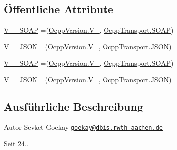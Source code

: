 \subsection*{Öffentliche Attribute}
\begin{DoxyCompactItemize}
\item 
\hyperlink{enumde_1_1rwth_1_1idsg_1_1steve_1_1ocpp_1_1_ocpp_protocol_a8d3c28a7f752ada8544f49a26fd75bf9}{V\-\_\-\_\-\-S\-O\-A\-P} =(\hyperlink{enumde_1_1rwth_1_1idsg_1_1steve_1_1ocpp_1_1_ocpp_version_a02a262b834136db4a30bb9a821c77574}{Ocpp\-Version.\-V\-\_}, \hyperlink{enumde_1_1rwth_1_1idsg_1_1steve_1_1ocpp_1_1_ocpp_transport_ae1fa7bdd519c49e7c5d175538ec2eb47}{Ocpp\-Transport.\-S\-O\-A\-P})
\item 
\hyperlink{enumde_1_1rwth_1_1idsg_1_1steve_1_1ocpp_1_1_ocpp_protocol_a0b890b1200cee602749371f323d0a686}{V\-\_\-\_\-\-J\-S\-O\-N} =(\hyperlink{enumde_1_1rwth_1_1idsg_1_1steve_1_1ocpp_1_1_ocpp_version_a02a262b834136db4a30bb9a821c77574}{Ocpp\-Version.\-V\-\_}, \hyperlink{enumde_1_1rwth_1_1idsg_1_1steve_1_1ocpp_1_1_ocpp_transport_aa9ac4184d327d7868285a13790f45cdc}{Ocpp\-Transport.\-J\-S\-O\-N})
\item 
\hyperlink{enumde_1_1rwth_1_1idsg_1_1steve_1_1ocpp_1_1_ocpp_protocol_a7476dab1a43648c24ed27bb7a6dc4cc1}{V\-\_\-\_\-\-S\-O\-A\-P} =(\hyperlink{enumde_1_1rwth_1_1idsg_1_1steve_1_1ocpp_1_1_ocpp_version_a73e998996dec6fa643fc3241249866d4}{Ocpp\-Version.\-V\-\_}, \hyperlink{enumde_1_1rwth_1_1idsg_1_1steve_1_1ocpp_1_1_ocpp_transport_ae1fa7bdd519c49e7c5d175538ec2eb47}{Ocpp\-Transport.\-S\-O\-A\-P})
\item 
\hyperlink{enumde_1_1rwth_1_1idsg_1_1steve_1_1ocpp_1_1_ocpp_protocol_a80b0fbd3a74af3443ec943f4e32fe7fa}{V\-\_\-\_\-\-J\-S\-O\-N} =(\hyperlink{enumde_1_1rwth_1_1idsg_1_1steve_1_1ocpp_1_1_ocpp_version_a73e998996dec6fa643fc3241249866d4}{Ocpp\-Version.\-V\-\_}, \hyperlink{enumde_1_1rwth_1_1idsg_1_1steve_1_1ocpp_1_1_ocpp_transport_aa9ac4184d327d7868285a13790f45cdc}{Ocpp\-Transport.\-J\-S\-O\-N})
\end{DoxyCompactItemize}


\subsection{Ausführliche Beschreibung}
\begin{DoxyAuthor}{Autor}
Sevket Goekay \href{mailto:goekay@dbis.rwth-aachen.de}{\tt goekay@dbis.\-rwth-\/aachen.\-de} 
\end{DoxyAuthor}
\begin{DoxySince}{Seit}
24.. 
\end{DoxySince}


